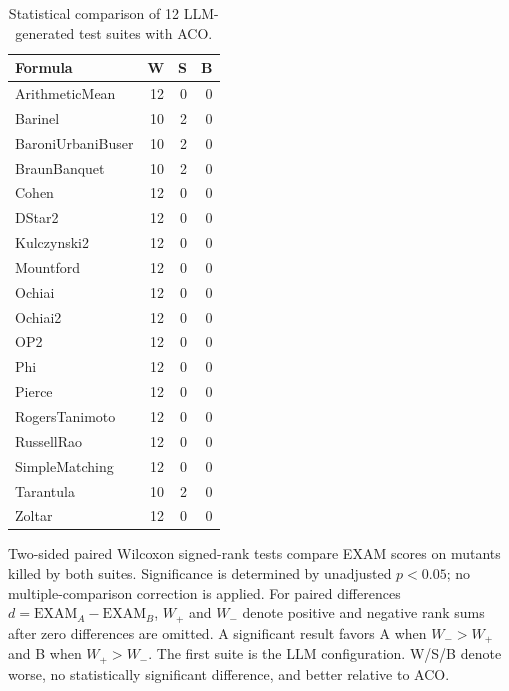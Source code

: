 \begin{table}[t]
\centering
\caption{Statistical comparison of 12 LLM-generated test suites with ACO.}
\label{tab:rq3bw-pairwise-counts}
\begin{tabular}{lrrr}
\toprule
Formula & W & S & B \\
\midrule
ArithmeticMean & 12 & 0 & 0 \\
Barinel & 10 & 2 & 0 \\
BaroniUrbaniBuser & 10 & 2 & 0 \\
BraunBanquet & 10 & 2 & 0 \\
Cohen & 12 & 0 & 0 \\
DStar2 & 12 & 0 & 0 \\
Kulczynski2 & 12 & 0 & 0 \\
Mountford & 12 & 0 & 0 \\
Ochiai & 12 & 0 & 0 \\
Ochiai2 & 12 & 0 & 0 \\
OP2 & 12 & 0 & 0 \\
Phi & 12 & 0 & 0 \\
Pierce & 12 & 0 & 0 \\
RogersTanimoto & 12 & 0 & 0 \\
RussellRao & 12 & 0 & 0 \\
SimpleMatching & 12 & 0 & 0 \\
Tarantula & 10 & 2 & 0 \\
Zoltar & 12 & 0 & 0 \\
\bottomrule
\end{tabular}
\par\smallskip
\begin{minipage}{\linewidth}\footnotesize Two-sided paired Wilcoxon signed-rank tests compare EXAM scores on mutants killed by both suites. Significance is determined by unadjusted $p<0.05$; no multiple-comparison correction is applied. For paired differences $d=\mathrm{EXAM}_{A}-\mathrm{EXAM}_{B}$, $W_+$ and $W_-$ denote positive and negative rank sums after zero differences are omitted. A significant result favors A when $W_->W_+$ and B when $W_+>W_-$. The first suite is the LLM configuration. W/S/B denote worse, no statistically significant difference, and better relative to ACO.
\end{minipage}
\end{table}
